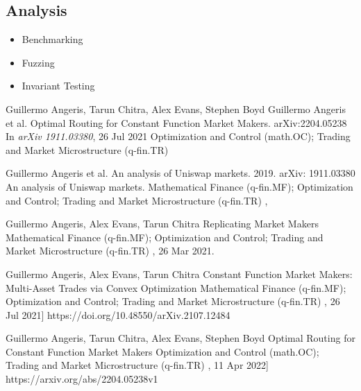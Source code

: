 \documentclass{article}
\begin{document}
	\subsection{Analysis}
	\begin{itemize}
		\item Benchmarking
		\item Fuzzing
		\item Invariant Testing
	\end{itemize}
	
	
	
	
\begin{thebibliography}{1}
Guillermo Angeris, Tarun Chitra, Alex Evans, Stephen Boyd
\newblock Guillermo Angeris et al. Optimal Routing for Constant Function Market Makers.	arXiv:2204.05238
\newblock In {\em arXiv 1911.03380}, 26 Jul 2021
    Optimization and Control (math.OC); Trading and Market Microstructure (q-fin.TR)


Guillermo Angeris et al. An analysis of Uniswap markets. 2019. arXiv: 1911.03380
\newblock An analysis of Uniswap markets.
Mathematical Finance (q-fin.MF); Optimization and Control; Trading and Market Microstructure (q-fin.TR)
, 

Guillermo Angeris, Alex Evans, Tarun Chitra
\newblock Replicating Market Makers
Mathematical Finance (q-fin.MF); Optimization and Control; Trading and Market Microstructure (q-fin.TR)
, 26 Mar 2021.


Guillermo Angeris, Alex Evans, Tarun Chitra
\newblock Constant Function Market Makers: Multi-Asset Trades via Convex Optimization
Mathematical Finance (q-fin.MF); Optimization and Control; Trading and Market Microstructure (q-fin.TR)
, 26 Jul 2021]
https://doi.org/10.48550/arXiv.2107.12484


Guillermo Angeris, Tarun Chitra, Alex Evans, Stephen Boyd
\newblock Optimal Routing for Constant Function Market Makers
Optimization and Control (math.OC); Trading and Market Microstructure (q-fin.TR)
, 11 Apr 2022]
https://arxiv.org/abs/2204.05238v1

\end{thebibliography}
	
	
	
\end{document}
